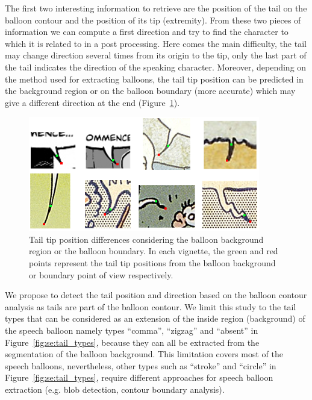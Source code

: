 The first two interesting information to retrieve are the position of the tail on the balloon contour and the position of its tip (extremity).
From these two pieces of information we can compute a first direction and try to find the character to which it is related to in a post processing.
Here comes the main difficulty, the tail may change direction several times from its origin to the tip, only the last part of the tail indicates the direction of the speaking character.
Moreover, depending on the method used for extracting balloons, the tail tip position can be predicted in the background region or on the balloon boundary (more accurate) which may give a different direction at the end (Figure~\ref{fig:se:tail_examples}).


    \begin{figure}[ht]%
      \centering
      \includegraphics[width=0.9\textwidth]{tail_examples.png}
    \caption[Differences between tail tip positions]{Tail tip position differences considering the balloon background region or the balloon boundary. In each vignette, the green and red points represent the tail tip positions from the balloon background or boundary point of view respectively.}
    \label{fig:se:tail_examples}
    \end{figure}

We propose to detect the tail position and direction based on the balloon contour analysis as tails are part of the balloon contour.
We limit this study to the tail types that can be considered as an extension of the inside region (background) of the speech balloon namely types ``comma'', ``zigzag'' and ``absent'' in Figure~\ref{fig:se:tail_types}, because they can all be extracted from the segmentation of the balloon background.
This limitation covers most of the speech balloons, nevertheless, other types such as ``stroke'' and ``circle'' in Figure~\ref{fig:se:tail_types}, require different approaches for speech balloon extraction (e.g. blob detection, contour boundary analysis).


